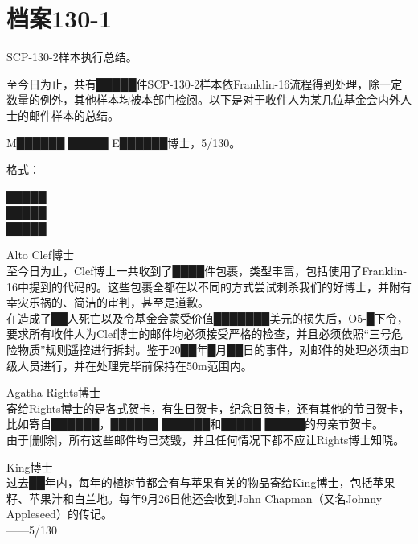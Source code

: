 \section{档案130-1}

\label{sec:DOC-document-130-1}

SCP-130-2样本执行总结。

至今日为止，共有█████件SCP-130-2样本依Franklin-16流程得到处理，除一定数量的例外，其他样本均被本部门检阅。以下是对于收件人为某几位基金会内外人士的邮件样本的总结。

M██████ █████ E██████博士，5\slash 130。

\hr

格式：

█████\\
█████\\
█████

\hr

Alto Clef博士\\
至今日为止，Clef博士一共收到了████件包裹，类型丰富，包括使用了Franklin-16中提到的代码的。这些包裹全都在以不同的方式尝试刺杀我们的好博士，并附有幸灾乐祸的、简洁的审判，甚至是道歉。\\
在造成了██人死亡以及令基金会蒙受价值███████美元的损失后，O5-█下令，要求所有收件人为Clef博士的邮件均必须接受严格的检查，并且必须依照“三号危险物质”规则遥控进行拆封。鉴于20██年█月██日的事件，对邮件的处理必须由D级人员进行，并在处理完毕前保持在50m范围内。

Agatha Rights博士\\
寄给Rights博士的是各式贺卡，有生日贺卡，纪念日贺卡，还有其他的节日贺卡，比如寄自██████，██████ ██████和█████ █████的母亲节贺卡。\\
由于{[}删除]，所有这些邮件均已焚毁，并且任何情况下都不应让Rights博士知晓。

King博士\\
过去██年内，每年的植树节都会有与苹果有关的物品寄给King博士，包括苹果籽、苹果汁和白兰地。每年9月26日他还会收到John Chapman（又名Johnny Appleseed）的传记。\\
——5\slash 130
